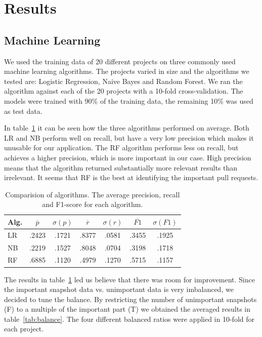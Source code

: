 \section{Results}
\label{sec:results}

\subsection{Machine Learning}
\label{sec:learning}

We used the training data of 20 different projects on three commonly used machine learning algorithms.
The projects varied in size and the algorithms we tested are: Logistic Regression, Naive Bayes and Random Forest.
We ran the algorithm against each of the 20 projects with a 10-fold cross-validation.
The models were trained with 90\% of the training data, the remaining 10\% was used as test data.

In table~\ref{tab:alg-compare} it can be seen how the three algorithms performed on average.
Both LR and NB perform well on recall, but have a very low precision which makes it unusable for our application.
The RF algorithm performs less on recall, but achieves a higher precision, which is more important in our case.
High precision means that the algorithm returned substantially more relevant results than irrelevant.
It seems that RF is the best at identifying the important pull requests.

\begin{table}
  \begin{tabular}{ l | c | c | c | c | c | c }
    Alg. & $\overline{p}$ & $\sigma(p)$ & $\overline{r}$ & $\sigma(r)$ & $\overline{F1}$ & $\sigma(F1)$ \\ \hline
    \hline
    LR & .2423 & .1721 & .8377 & .0581 & .3455 & .1925 \\ \hline
    NB & .2219 & .1527 & .8048 & .0704 & .3198 & .1718 \\ \hline
    RF & .6885 & .1120 & .4979 & .1270 & .5715 & .1157 \\
  \end{tabular}
  \caption[Comparision of algorithms]{Comparision of algorithms. The average precision, recall and F1-score for each algorithm. }
  \label{tab:alg-compare}
\end{table}

The results in table~\ref{tab:alg-compare} led us believe that there was room for improvement.
Since the important snapshot data vs. unimportant data is very imbalanced, we decided to tune the balance.
By restricting the number of unimportant snapshots (F) to a multiple of the important part (T) we obtained the averaged results in table~\ref{tab:balance}.
The four different balanced ratios were applied in 10-fold for each project.


